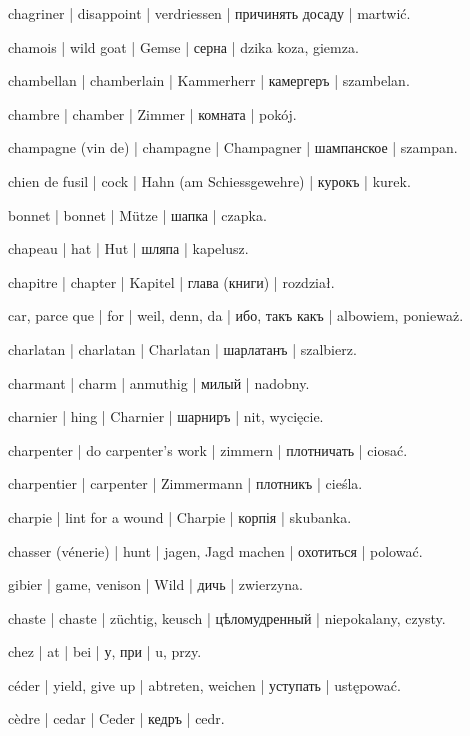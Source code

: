 \begin{outdent}{1em}

chagriner | disappoint | verdriessen | причинять досаду | martwić.

chamois | wild goat | Gemse | серна | dzika koza, giemza.

chambellan | chamberlain | Kammerherr | камергеръ | szambelan.

chambre | chamber | Zimmer | комната | pokój.

champagne (vin de) | champagne | Champagner | шампанское | szampan.

chien de fusil | cock | Hahn (am Schiessgewehre) | курокъ | kurek.

bonnet | bonnet | Mütze | шапка | czapka.

chapeau | hat | Hut | шляпа | kapelusz.

chapitre | chapter | Kapitel | глава (книги) | rozdział.

car, parce que | for | weil, denn, da | ибо, такъ какъ | albowiem, ponieważ.

charlatan | charlatan | Charlatan | шарлатанъ | szalbierz.

charmant | charm | anmuthig | милый | nadobny.

charnier | hing | Charnier | шарниръ | nit, wycięcie.

charpenter | do carpenter’s work | zimmern | плотничать | ciosać.

\uvsubentry{}
charpentier | carpenter | Zimmermann | плотникъ | cieśla.

charpie | lint for a wound | Charpie | корпія | skubanka.

chasser (vénerie) | hunt | jagen, Jagd machen | охотиться | polować.

\uvsubentry{}
gibier | game, venison | Wild | дичь | zwierzyna.

chaste | chaste | züchtig, keusch | цѣломудренный | niepokalany, czysty.

chez | at | bei | у, при | u, przy.

céder | yield, give up | abtreten, weichen | уступать | ustępować.

cèdre | cedar | Ceder | кедръ | cedr.


\end{outdent}
